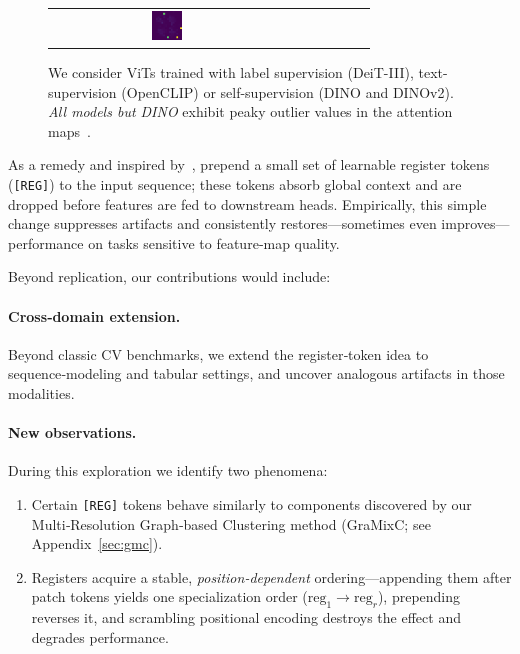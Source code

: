 \documentclass{article}
\newcommand{\RegTok}{\texttt{[REG]}\xspace}
\newcommand{\citet}{\textcite}
\begin{document}
\begin{figure}[t]
{\begin{tabular}{c cc cc cc }
      \includegraphics[width=0.13\textwidth]{resources/230914_1202_fig2_vizs_various_models/vit_giant_patch14_dinov2.lvd142m_1753_lastattmap.png}
      \\
    \end{tabular}
    }
    \caption{
      We consider ViTs trained with label supervision (DeiT-III), text-supervision (OpenCLIP) or self-supervision (DINO and DINOv2).
      \emph{All models but DINO} exhibit peaky outlier values in the attention maps~\cite{darcetVisionTransformersNeed2024}.
    }  
    \label{fig:allvits}
\end{figure}

As a remedy and inspired by~\citet{bulatovRecurrentMemoryTransformer2022}, \citet{darcetVisionTransformersNeed2024} prepend a small set of learnable register tokens (\RegTok) to the input sequence; these tokens absorb global context and are dropped before features are fed to downstream heads. 
Empirically, this simple change suppresses artifacts and consistently restores—sometimes even improves—performance on tasks sensitive to feature‑map quality.

Beyond replication, our contributions would include:

\paragraph{Cross‑domain extension.}
Beyond classic CV benchmarks, we extend the register‑token idea to sequence‑modeling and tabular settings, and uncover analogous artifacts in those modalities.

\paragraph{New observations.}
During this exploration we identify two phenomena:  
\begin{enumerate}
    \item Certain \RegTok tokens behave similarly to components discovered by our
          Multi‑Resolution Graph‑based Clustering method (GraMixC; see Appendix~\ref{sec:gmc}).
    \item Registers acquire a stable, \emph{position‑dependent} ordering—appending them
          after patch tokens yields one specialization order ($\text{reg}_1\!\rightarrow\!\text{reg}_r$),
          prepending reverses it, and scrambling positional encoding destroys the effect and
          degrades performance.
\end{enumerate}
\end{document}
